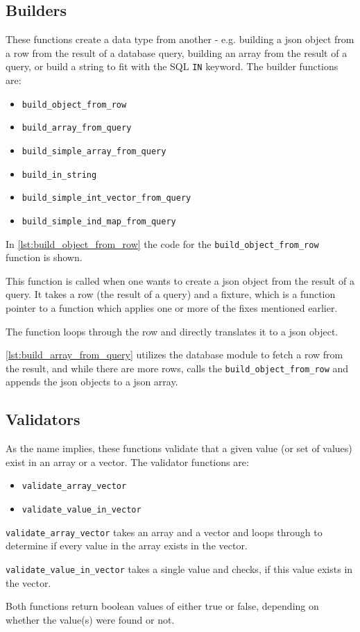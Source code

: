 \subsection{Builders}
These functions create a data type from another - e.g. building a \ac{json} object from a row from the result of a database query, building an array from the result of a query, or build a string to fit with the SQL \lstinline|IN| keyword. The builder functions are:
\begin{itemize}
\item \lstinline|build_object_from_row|
\item \lstinline|build_array_from_query|
\item \lstinline|build_simple_array_from_query|
\item \lstinline|build_in_string|
\item \lstinline|build_simple_int_vector_from_query|
\item \lstinline|build_simple_ind_map_from_query|
\end{itemize}

In \autoref{lst:build_object_from_row} the code for the \lstinline|build_object_from_row| function is shown. 



This function is called when one wants to create a \ac{json} object from the result of a query. It takes a row (the result of a query) and a fixture, which is a function pointer to a function which applies one or more of the fixes mentioned earlier. 

The function loops through the row and directly translates it to a \ac{json} object.



\autoref{lst:build_array_from_query} utilizes the database module to fetch a row from the result, and  while there are more rows, calls the \lstinline|build_object_from_row| and appends the \ac{json} objects to a \ac{json} array.

\subsection{Validators}
As the name implies, these functions validate that a given value (or set of values) exist in an array or a vector. The validator functions are:
\begin{itemize}
\item \lstinline|validate_array_vector|
\item \lstinline|validate_value_in_vector|
\end{itemize}

\lstinline|validate_array_vector| takes an array and a vector and loops through to determine if every value in the array exists in the vector. 

\lstinline|validate_value_in_vector| takes a single value and checks, if this value exists in the vector.

Both functions return boolean values of either true or false, depending on whether the value(s) were found or not.